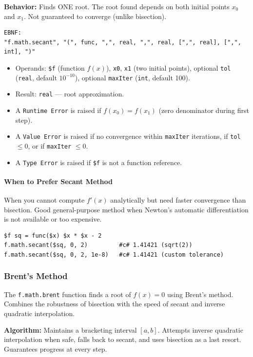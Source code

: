 \textbf{Behavior:} Finds ONE root. The root found depends on both initial points $x_0$ and $x_1$. Not guaranteed to converge (unlike bisection).

\begin{verbatim}
EBNF:
"f.math.secant", "(", func, ",", real, ",", real, [",", real], [",", int], ")"
\end{verbatim}
\begin{itemize}
\item Operands: \texttt{\$f} (function $f(x)$), \texttt{x0}, \texttt{x1} (two initial points), optional \texttt{tol} (\texttt{real}, default $10^{-10}$), optional \texttt{maxIter} (\texttt{int}, default 100).
\item Result: \texttt{real} --- root approximation.
\item A \texttt{Runtime Error} is raised if $f(x_0) = f(x_1)$ (zero denominator during first step).
\item A \texttt{Value Error} is raised if no convergence within \texttt{maxIter} iterations, if \texttt{tol} $\leq 0$, or if \texttt{maxIter} $\leq 0$.
\item A \texttt{Type Error} is raised if \texttt{\$f} is not a function reference.
\end{itemize}

\paragraph{When to Prefer Secant Method}
When you cannot compute $f'(x)$ analytically but need faster convergence than bisection. Good general-purpose method when Newton's automatic differentiation is not available or too expensive.

\begin{verbatim}
$f sq = func($x) $x * $x - 2
f.math.secant($sq, 0, 2)         #c# 1.41421 (sqrt(2))
f.math.secant($sq, 0, 2, 1e-8)   #c# 1.41421 (custom tolerance)
\end{verbatim}

\subsubsection{Brent's Method}
The \texttt{f.math.brent} function finds a root of $f(x) = 0$ using Brent's method. Combines the robustness of bisection with the speed of secant and inverse quadratic interpolation.

\textbf{Algorithm:} Maintains a bracketing interval $[a, b]$. Attempts inverse quadratic interpolation when safe, falls back to secant, and uses bisection as a last resort. Guarantees progress at every step.

